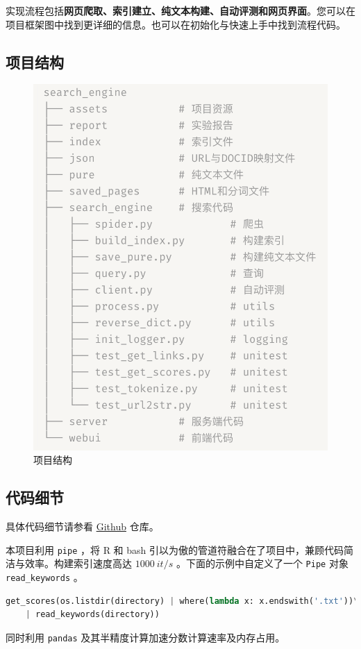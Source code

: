 \documentclass{ctexart}
\begin{document}
实现流程包括\textbf{网页爬取、索引建立、纯文本构建、自动评测和网页界面}。您可以在项目框架图中找到更详细的信息。也可以在初始化与快速上手中找到流程代码。

\subsection{项目结构}

\begin{figure}[h]
	\centering
	\includegraphics[width=0.55\columnwidth]{tree.png}
	\caption{项目结构}
\end{figure}

\subsection{代码细节}

具体代码细节请参看 \href{https://github.com/huyiwen/search_engine}{Github} 仓库。

本项目利用 \verb|pipe| ，将 R 和 bash 引以为傲的管道符融合在了项目中，兼顾代码简洁与效率。构建索引速度高达 $1000\ it/s$ 。下面的示例中自定义了一个 \verb|Pipe| 对象 \verb|read_keywords| 。

\begin{lstlisting}[language=Python]
get_scores(os.listdir(directory) | where(lambda x: x.endswith('.txt'))\
    | read_keywords(directory))
\end{lstlisting}

同时利用 \verb|pandas| 及其半精度计算加速分数计算速率及内存占用。
\end{document}
